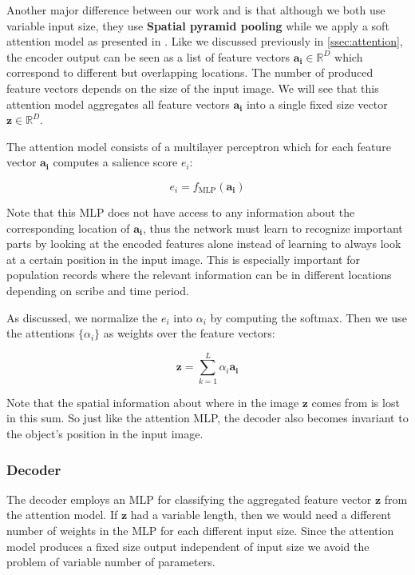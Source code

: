 Another major difference between our work and \cite{FornesCnnCategorization} is that although we both use variable input size, they use \textbf{Spatial pyramid pooling} while we apply a soft attention model as presented in \cite{AttendAndTell}. Like we discussed previously in \ref{ssec:attention}, the encoder output can be seen as a list of feature vectors $\mathbf{a_i} \in \mathbb{R}^D$ which correspond to different but overlapping locations. The number of produced feature vectors depends on the size of the input image. We will see that this attention model aggregates all feature vectors $\mathbf{a_i}$ into a single fixed size vector $\mathbf{z} \in \mathbb{R}^D$.

The attention model consists of a multilayer perceptron which for each feature vector $\mathbf{a_i}$ computes a salience score $e_i$:

\[
e_i = f_\text{MLP}(\mathbf{a_i})
\]

Note that this MLP does not have access to any information about the corresponding location of $\mathbf{a_i}$, thus the network must learn to recognize important parts by looking at the encoded features alone instead of learning to always look at a certain position in the input image. This is especially important for population records where the relevant information can be in different locations depending on scribe and time period.

As discussed, we normalize the $e_i$ into $\alpha_i$ by computing the softmax. Then we use the attentions $\{\alpha_i\}$ as weights over the feature vectors:

\[
\mathbf{z} = \sum_{k=1}^L \alpha_i \mathbf{a_i}
\]

Note that the spatial information about where in the image $\mathbf{z}$ comes from is lost in this sum. So just like the attention MLP, the decoder also becomes invariant to the object's position in the input image.

\subsubsection{Decoder}

The decoder employs an MLP for classifying the aggregated feature vector $\mathbf{z}$ from the attention model.
If $\mathbf{z}$ had a variable length, then we would need a different number of weights in the MLP for each different input size. Since the attention model produces a fixed size output independent of input size we avoid the problem of variable number of parameters.

